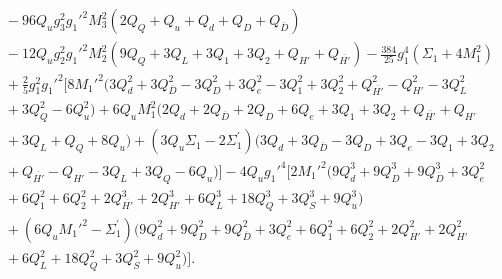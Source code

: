 \documentclass[preprint,amsmath,amssymb,aps,superscriptaddress,prd,showpacs,floatfix,nofootinbib]{revtex4-1}
\begin{document}
\begin{subequations}
\begin{align}
&{}-96Q_ug_3^2g_1'^2M_3^2\left ( 2Q_Q+Q_u+Q_d+Q_D+Q_{\overline{D}}\right )\nonumber\\
&{}-12Q_ug_2^2g_1'^2M_2^2\left ( 9Q_Q+3Q_L+3Q_1+3Q_2+Q_{H'}+Q_{\overline{H'}}\right )-\frac{384}{25}g_1^4\left ( \Sigma_1+4M_1^2\right )\nonumber\\
&{}+\frac{2}{5}g_1^2g_1'^2\big [ 8M_1'^2 ( 3Q_d^2+3Q_{\overline{D}}^2-3Q_D^2+3Q_e^2-3Q_1^2+3Q_2^2+Q_{\overline{H'}}^2-Q_{H'}^2-3Q_L^2\nonumber\\
&{}+3Q_Q^2-6Q_u^2 )+6Q_uM_1^2 ( 2Q_d+2Q_{\overline{D}}+2Q_D+6Q_e+3Q_1+3Q_2+Q_{\overline{H'}}+Q_{H'}\nonumber\\
&{}+3Q_L+Q_Q+8Q_u )+\left ( 3Q_u\Sigma_1-2\Sigma_1^\prime\right ) ( 3Q_d+3Q_{\overline{D}}-3Q_D+3Q_e-3Q_1+3Q_2\nonumber\\
&{}+Q_{\overline{H'}}-Q_{H'}-3Q_L+3Q_Q-6Q_u )\big ]-4Q_ug_1'^4\big [ 2M_1'^2 ( 9Q_d^3+9Q_D^3+9Q_{\overline{D}}^3+3Q_e^2\nonumber\\
&{}+6Q_1^2+6Q_2^2+2Q_{\overline{H'}}^3+2Q_{H'}^3+6Q_L^3+18Q_Q^3+3Q_S^3+9Q_u^3 )\nonumber\\
&{}+\left(6Q_uM_1'^2-\Sigma_1^\prime\right )( 9Q_d^2+9Q_D^2+9Q_{\overline{D}}^2+3Q_e^2+6Q_1^2+6Q_2^2+2Q_{\overline{H'}}^2+2Q_{H'}^2\nonumber\\
&{}+6Q_L^2+18Q_Q^2+3Q_S^2+9Q_u^2 )\big ].\label{eq:USSMmu222Ot2Coeff}
\end{align}
\end{subequations}

{}
\end{document}
